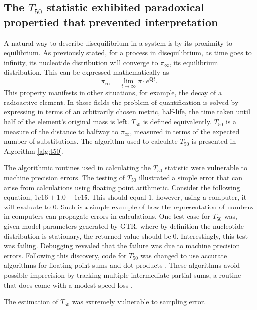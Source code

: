 

\subsection*{The $T_{50}$ statistic exhibited paradoxical propertied that prevented interpretation}

A natural way to describe disequilibrium in a system is by its proximity to equilibrium. As previously stated, for a process in disequilibrium, as time goes to infinity, its nucleotide distribution will converge to $\pi_\infty$, its equilibrium distribution. This can be expressed mathematically as 
$$\pi_\infty = \lim_{t \to \infty}\pi \cdot e^{\mathbf{Q}t}.$$ 
This property manifests in other situations, for example, the decay of a radioactive element. In those fields the problem of quantification is solved by expressing in terms of an arbitrarily chosen metric, half-life, the time taken until half of the element's original mass is left. $T_{50}$ is defined equivalently. ${T_{50}}$ is a measure of the distance to halfway to $\pi_\infty$, measured in terms of the expected number of substitutions. The algorithm used to calculate $T_{50}$ is presented in Algorithm \ref{alg:t50}.

The algorithmic routines used in calculating the $T_{50}$ statistic were vulnerable to machine precision errors. The testing of $T_{50}$ illustrated a simple error that can arise from calculations using \gls{floating point arithmetic}. Consider the following equation, $1e16 + 1.0 - 1e16$. This should equal $1$, however, using a computer, it will evaluate to $0$. Such is a simple example of how the representation of numbers in computers can propagate errors in calculations. One test case for $T_{50}$ was, given model parameters generated by GTR, where by definition the nucleotide distribution is stationary, the returned value should be $0$. Interestingly, this test was failing. Debugging revealed that the failure was due to machine precision errors. Following this discovery, code for $T_{50}$ was changed to use accurate algorithms for floating point sums and dot products \citep{accupy}. These algorithms avoid possible imprecision by tracking multiple intermediate partial sums, a routine that does come with a modest speed loss \citep{Shewchuk1997AdaptivePredicates, Ogita2005AccurateProduct}. 

The estimation of $T_{50}$ was extremely vulnerable to sampling error.




